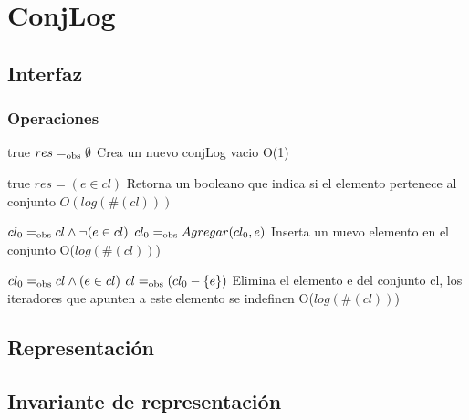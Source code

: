 \section{ConjLog}

\subsection{Interfaz}



\subsubsection*{Operaciones}

{true}
{$res =_{\mathrm{obs}} \emptyset$}
{Crea un nuevo conjLog vacio}
{O(1)}
{}

{true}
{$res = (e \in cl)$}
{Retorna un booleano que indica si el elemento pertenece al conjunto}
{$O(log(\#(cl)))$}
{}

{$cl_0 =_{\mathrm{obs}} cl \land \neg(e \in cl)$}
{$cl_0 =_{\mathrm{obs}} Agregar(cl_0, e)$}
{Inserta un nuevo elemento en el conjunto}
{O($log(\#(cl))$)}
{}

{$cl_0 =_{\mathrm{obs}} cl \land (e \in cl)$}
{$cl =_{\mathrm{obs}} (cl_0 - \{e\})$}
{Elimina el elemento e del conjunto cl, los iteradores que apunten a este elemento se indefinen}
{O($log(\#(cl))$)}
{}

\subsection{Representación}


\newpage
\subsection{Invariante de representación}

